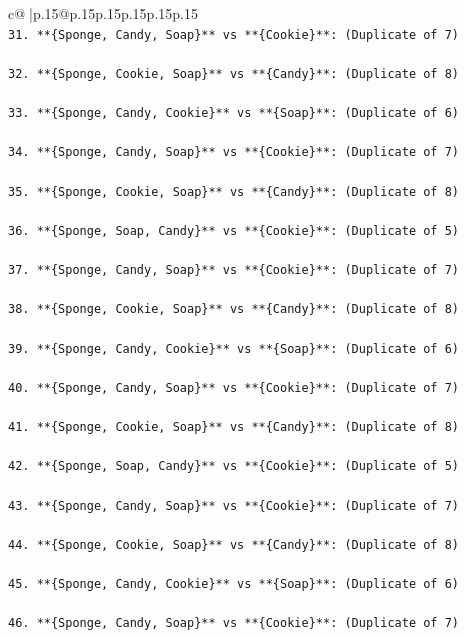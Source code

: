 \documentclass{article}
\begin{document}
{\begin{supertabular}{c@{$\;$}|p{.15\linewidth}@{}p{.15\linewidth}p{.15\linewidth}p{.15\linewidth}p{.15\linewidth}p{.15\linewidth}}
{{{\\ 
\texttt{31. **\{Sponge, Candy, Soap\}** vs **\{Cookie\}**: (Duplicate of 7)} \\
\\ 
\texttt{32. **\{Sponge, Cookie, Soap\}** vs **\{Candy\}**: (Duplicate of 8)} \\
\\ 
\texttt{33. **\{Sponge, Candy, Cookie\}** vs **\{Soap\}**: (Duplicate of 6)} \\
\\ 
\texttt{34. **\{Sponge, Candy, Soap\}** vs **\{Cookie\}**: (Duplicate of 7)} \\
\\ 
\texttt{35. **\{Sponge, Cookie, Soap\}** vs **\{Candy\}**: (Duplicate of 8)} \\
\\ 
\texttt{36. **\{Sponge, Soap, Candy\}** vs **\{Cookie\}**: (Duplicate of 5)} \\
\\ 
\texttt{37. **\{Sponge, Candy, Soap\}** vs **\{Cookie\}**: (Duplicate of 7)} \\
\\ 
\texttt{38. **\{Sponge, Cookie, Soap\}** vs **\{Candy\}**: (Duplicate of 8)} \\
\\ 
\texttt{39. **\{Sponge, Candy, Cookie\}** vs **\{Soap\}**: (Duplicate of 6)} \\
\\ 
\texttt{40. **\{Sponge, Candy, Soap\}** vs **\{Cookie\}**: (Duplicate of 7)} \\
\\ 
\texttt{41. **\{Sponge, Cookie, Soap\}** vs **\{Candy\}**: (Duplicate of 8)} \\
\\ 
\texttt{42. **\{Sponge, Soap, Candy\}** vs **\{Cookie\}**: (Duplicate of 5)} \\
\\ 
\texttt{43. **\{Sponge, Candy, Soap\}** vs **\{Cookie\}**: (Duplicate of 7)} \\
\\ 
\texttt{44. **\{Sponge, Cookie, Soap\}** vs **\{Candy\}**: (Duplicate of 8)} \\
\\ 
\texttt{45. **\{Sponge, Candy, Cookie\}** vs **\{Soap\}**: (Duplicate of 6)} \\
\\ 
\texttt{46. **\{Sponge, Candy, Soap\}** vs **\{Cookie\}**: (Duplicate of 7)} \\
}}}
\end{supertabular}}
\end{document}
